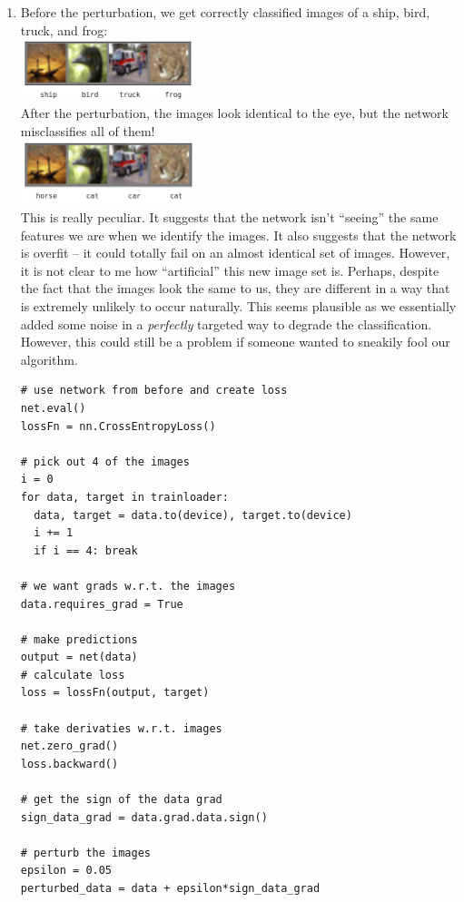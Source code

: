 \documentclass{article}
\begin{document}
\begin{enumerate}
        \newpage
        \item Before the perturbation, we get correctly classified images of a ship, bird, truck, and frog: \\
        \includegraphics[width=0.4\textwidth]{code/A4e1.png} \\
        After the perturbation, the images look identical to the eye, but the network misclassifies all of them! \\
        \includegraphics[width=0.4\textwidth]{code/A4e2.png} \\
        This is really peculiar.
        It suggests that the network isn't ``seeing'' the same features we are when we identify the images.
        It also suggests that the network is overfit -- it could totally fail on an almost identical set of images.
        However, it is not clear to me how ``artificial'' this new image set is.
        Perhaps, despite the fact that the images look the same to us, they are different in a way that is extremely unlikely to occur naturally.
        This seems plausible as we essentially added some noise in a \textit{perfectly} targeted way to degrade the classification.
        However, this could still be a problem if someone wanted to sneakily fool our algorithm.
        \begin{verbatim}
# use network from before and create loss
net.eval()
lossFn = nn.CrossEntropyLoss()

# pick out 4 of the images
i = 0
for data, target in trainloader:
  data, target = data.to(device), target.to(device)
  i += 1
  if i == 4: break

# we want grads w.r.t. the images
data.requires_grad = True

# make predictions
output = net(data)
# calculate loss
loss = lossFn(output, target)

# take derivaties w.r.t. images
net.zero_grad()
loss.backward()

# get the sign of the data grad
sign_data_grad = data.grad.data.sign()

# perturb the images
epsilon = 0.05
perturbed_data = data + epsilon*sign_data_grad


\end{verbatim}
\end{enumerate}
\end{document}
